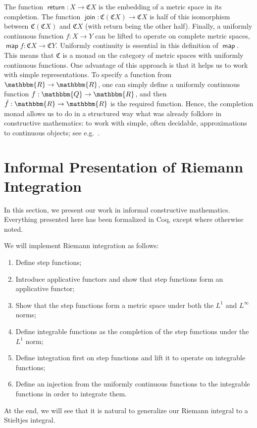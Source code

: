 \documentclass{elsarticle}
\newcommand{\tmop}[1]{\ensuremath{\operatorname{#1}}}
\newcommand{\complete}{\ensuremath{\mathfrak{C}}}
\begin{document}
The function $\tmop{\mathsf{return}} : X \rightarrow \complete X$ is the
embedding of a metric space in its completion. The function
$\tmop{\mathsf{join}} : \complete ( \complete X) \rightarrow \complete X$ is
half of this isomorphism between $\complete ( \complete X)$ and $\complete X$
(with return being the other half). Finally, a uniformly continuous function
$f : X \rightarrow Y$ can be lifted to operate on complete metric spaces,
$\tmop{\mathsf{map}} f : \complete X \rightarrow \complete Y$. Uniformly
continuity is essential in this definition of $\tmop{\mathsf{map}}$. This
means that {\complete} is a monad on the category of metric spaces with
uniformly continuous functions. One advantage of this approach is that it
helps us to work with simple representations. To specify a function from
$\mathbbm{R} \rightarrow \mathbbm{R}$, one can simply define a uniformly
continuous function $f : \mathbbm{Q} \rightarrow \mathbbm{R}$, and then
$\check{f} : \mathbbm{R} \rightarrow \mathbbm{R}$ is the required function.
Hence, the completion monad allows us to do in a structured way what was
already folklore in constructive mathematics: to work with simple, often
decidable, approximations to continuous objects; see
e.g.~{\cite{Schwichtenberg}}.

\section{Informal Presentation of Riemann Integration}

In this section, we present our work in informal constructive mathematics.
Everything presented here has been formalized in Coq, except where otherwise
noted.

We will implement Riemann integration as follows:
\begin{enumerate}
  \item Define step functions;
  
  \item Introduce applicative functors and show that step functions form an
  applicative functor;
  
  \item Show that the step functions form a metric space under both the $L^1$
  and $L^{\infty}$ norms;
  
  \item Define integrable functions as the completion of the step functions
  under the $L^1$ norm;
  
  \item Define integration first on step functions and lift it to operate on
  integrable functions;
  
  \item Define an injection from the uniformly continuous functions to the
  integrable functions in order to integrate them.
\end{enumerate}
At the end, we will see that it is natural to generalize our Riemann integral
to a Stieltjes integral.
\end{document}
